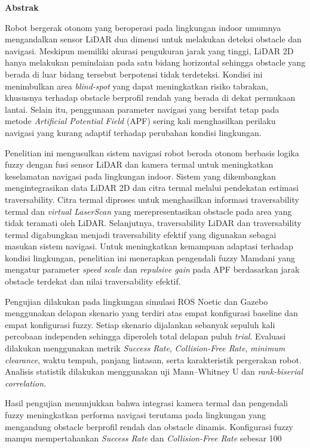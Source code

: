\textbf{Abstrak}

Robot bergerak otonom yang beroperasi pada lingkungan indoor umumnya mengandalkan sensor LiDAR dua dimensi untuk melakukan deteksi obstacle dan navigasi. Meskipun memiliki akurasi pengukuran jarak yang tinggi, LiDAR 2D hanya melakukan pemindaian pada satu bidang horizontal sehingga obstacle yang berada di luar bidang tersebut berpotensi tidak terdeteksi. Kondisi ini menimbulkan area \textit{blind-spot} yang dapat meningkatkan risiko tabrakan, khususnya terhadap obstacle berprofil rendah yang berada di dekat permukaan lantai. Selain itu, penggunaan parameter navigasi yang bersifat tetap pada metode \textit{Artificial Potential Field} (APF) sering kali menghasilkan perilaku navigasi yang kurang adaptif terhadap perubahan kondisi lingkungan.

Penelitian ini mengusulkan sistem navigasi robot beroda otonom berbasis logika fuzzy dengan fusi sensor LiDAR dan kamera termal untuk meningkatkan keselamatan navigasi pada lingkungan indoor. Sistem yang dikembangkan mengintegrasikan data LiDAR 2D dan citra termal melalui pendekatan estimasi traversability. Citra termal diproses untuk menghasilkan informasi traversability termal dan \textit{virtual LaserScan} yang merepresentasikan obstacle pada area yang tidak teramati oleh LiDAR. Selanjutnya, traversability LiDAR dan traversability termal digabungkan menjadi traversability efektif yang digunakan sebagai masukan sistem navigasi. Untuk meningkatkan kemampuan adaptasi terhadap kondisi lingkungan, penelitian ini menerapkan pengendali fuzzy Mamdani yang mengatur parameter \textit{speed scale} dan \textit{repulsive gain} pada APF berdasarkan jarak obstacle terdekat dan nilai traversability efektif.

Pengujian dilakukan pada lingkungan simulasi ROS Noetic dan Gazebo menggunakan delapan skenario yang terdiri atas empat konfigurasi baseline dan empat konfigurasi fuzzy. Setiap skenario dijalankan sebanyak sepuluh kali percobaan independen sehingga diperoleh total delapan puluh \textit{trial}. Evaluasi dilakukan menggunakan metrik \textit{Success Rate}, \textit{Collision-Free Rate}, \textit{minimum clearance}, waktu tempuh, panjang lintasan, serta karakteristik pergerakan robot. Analisis statistik dilakukan menggunakan uji Mann--Whitney U dan \textit{rank-biserial correlation}.

Hasil pengujian menunjukkan bahwa integrasi kamera termal dan pengendali fuzzy meningkatkan performa navigasi terutama pada lingkungan yang mengandung obstacle berprofil rendah dan obstacle dinamis. Konfigurasi fuzzy mampu mempertahankan \textit{Success Rate} dan \textit{Collision-Free Rate} sebesar 100%

